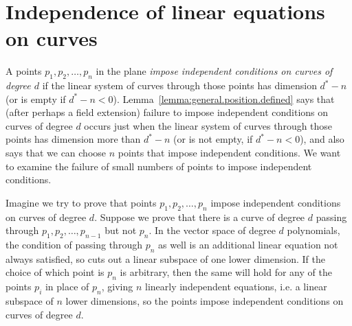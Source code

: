 \section{Independence of linear equations on curves}
A points \(p_1,p_2,\dots,p_n\) in the plane \emph{impose independent conditions on curves of degree \(d\)} if the linear system of curves through those points has dimension \(d^*-n\) (or is empty if \(d^*-n<0\)).
Lemma~\vref{lemma:general.position.defined} says that (after perhaps a field extension) failure to impose independent conditions on curves of degree \(d\) occurs just when the linear system of curves through those points has dimension more than \(d^*-n\) (or is not empty, if \(d^*-n<0\)), and also says that we can choose \(n\) points that impose independent conditions.
We want to examine the failure of small numbers of points to impose independent conditions.

Imagine we try to prove that points \(p_1,p_2,\dots,p_n\) impose independent conditions on curves of degree \(d\).
Suppose we prove that there is a curve of degree \(d\) passing through \(p_1,p_2,\dots,p_{n-1}\) but not \(p_n\).
In the vector space of degree \(d\) polynomials, the condition of passing through \(p_n\) as well is an additional linear equation not always satisfied, so cuts out a linear subspace of one lower dimension.
If the choice of which point is \(p_n\) is arbitrary, then the same will hold for any of the points \(p_i\) in place of \(p_n\), giving \(n\) linearly independent equations, i.e. a linear subspace of \(n\) lower dimensions, so the points impose independent conditions on curves of degree \(d\).

